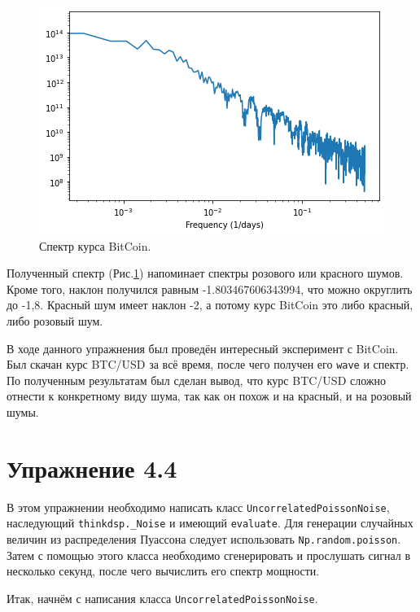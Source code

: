 \documentclass[a4paper, 14pt]{extarticle}
\begin{document}
    \begin{figure}[h]
        \centering
        \includegraphics[width=0.8\linewidth]{resources/Images/task3_spectrum_btc}
        \caption{Спектр курса BitCoin.}
        \label{fig:task3_spectrum_btc}
    \end{figure}

    Полученный спектр (Рис.\ref{fig:task3_spectrum_btc}) напоминает спектры розового или красного шумов.
    Кроме того, наклон получился равным -1.803467606343994, что можно округлить до -1,8. Красный шум имеет наклон -2,
    а потому курс BitCoin это либо красный, либо розовый шум.

    В ходе данного упражнения был проведён интересный эксперимент с BitCoin. Был скачан курс BTC/USD за всё время,
    после чего получен его \texttt{wave} и спектр. По полученным результатам был сделан вывод, что курс BTC/USD сложно
    отнести к конкретному виду шума, так как он похож и на красный, и на розовый шумы.

    \newpage

    \section{Упражнение 4.4}
    \label{sec:task4}

    В этом упражнении необходимо написать класс \texttt{UncorrelatedPoissonNoise}, наследующий \texttt{thinkdsp.\_Noise}
    и имеющий \texttt{evaluate}. Для генерации случайных величин из распределения Пуассона следует использовать
    \texttt{Np.random.poisson}. Затем с помощью этого класса необходимо сгенерировать и прослушать сигнал в несколько
    секунд, после чего вычислить его спектр мощности.

    Итак, начнём с написания класса \texttt{UncorrelatedPoissonNoise}.
\end{document}
